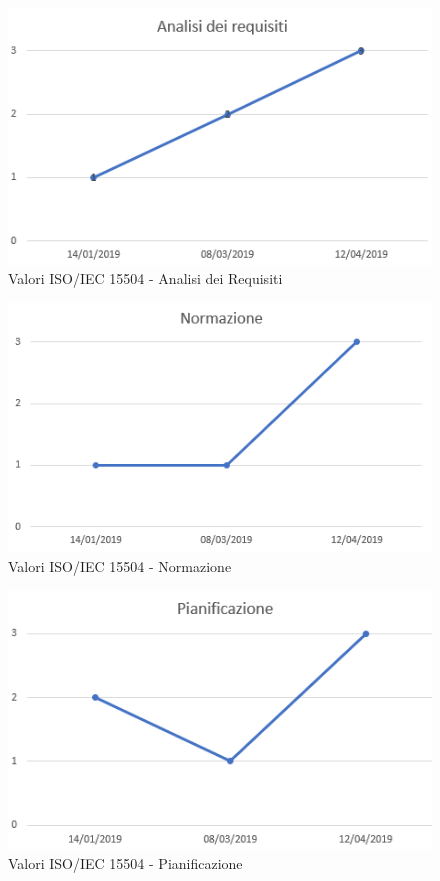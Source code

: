 \begin{figure}[H]
	\centering
	\includegraphics[scale=1]{images/resoconto/Analisi.png}
	\caption{Valori ISO/IEC 15504 - Analisi dei Requisiti}	
\end{figure}


\begin{figure}[H]
	\centering
	\includegraphics[scale=1]{images/resoconto/Normazione.png}
	\caption{Valori ISO/IEC 15504 - Normazione}	
\end{figure}


\begin{figure}[H]
	\centering
	\includegraphics[scale=1]{images/resoconto/Pianificazione.png}
	\caption{Valori ISO/IEC 15504 - Pianificazione}	
\end{figure}


